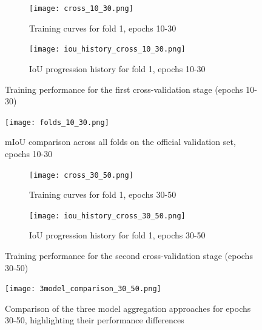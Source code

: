 \documentclass[]{article}
\begin{document}
\begin{figure}[htbp]
    \centering
    \begin{subfigure}[b]{0.8\textwidth}
        \centering
        \texttt{[image: cross\_10\_30.png]}
        \caption{Training curves for fold 1, epochs 10-30}
        \label{fig:cross_val_10_30}
    \end{subfigure}
    \vspace{0.5cm}
    \begin{subfigure}[b]{0.8\textwidth}
        \centering
        \texttt{[image: iou\_history\_cross\_10\_30.png]}
        \caption{IoU progression history for fold 1, epochs 10-30}
        \label{fig:cross_val_10_30_iou_his}
    \end{subfigure}
    \caption{Training performance for the first cross-validation stage (epochs 10-30)}
    \label{fig:cross_val_10_30_combined}
\end{figure}

\begin{figure}[htbp]
    \centering
    \texttt{[image: folds\_10\_30.png]}
    \caption{mIoU comparison across all folds on the official validation set, epochs 10-30}
    \label{fig:cross_val_10_30_val}
\end{figure}

\begin{figure}[htbp]
    \centering
    \begin{subfigure}[b]{0.8\textwidth}
        \centering
        \texttt{[image: cross\_30\_50.png]}
        \caption{Training curves for fold 1, epochs 30-50}
        \label{fig:cross_val_30_50}
    \end{subfigure}
    \vspace{0.5cm}
    \begin{subfigure}[b]{0.8\textwidth}
        \centering
        \texttt{[image: iou\_history\_cross\_30\_50.png]}
        \caption{IoU progression history for fold 1, epochs 30-50}
        \label{fig:cross_val_30_50_iou_his}
    \end{subfigure}
    \caption{Training performance for the second cross-validation stage (epochs 30-50)}
    \label{fig:cross_val_30_50_combined}
\end{figure}

\begin{figure}[htbp]
    \centering
    \texttt{[image: 3model\_comparison\_30\_50.png]}
    \caption{Comparison of the three model aggregation approaches for epochs 30-50, highlighting their performance differences}
    \label{fig:3model_comparison_30_50}
\end{figure}
\end{document}
